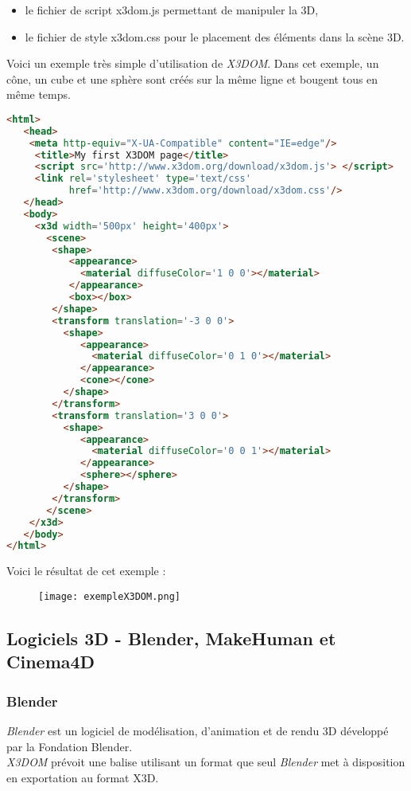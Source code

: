\begin{itemize}
\item le fichier de script x3dom.js permettant de manipuler la 3D,
\item le fichier de style x3dom.css pour le placement des éléments dans la scène 3D.\\

\end{itemize}
\pagebreak
Voici un exemple très simple d'utilisation de \textit{X3DOM}. Dans cet exemple, un cône, un cube et une sphère sont créés sur la même ligne et bougent tous en même temps.

\lstset{style=mystyle} 
\begin{lstlisting}[language=Html]
<html> 
   <head>
    <meta http-equiv="X-UA-Compatible" content="IE=edge"/> 
     <title>My first X3DOM page</title> 
     <script src='http://www.x3dom.org/download/x3dom.js'> </script> 
     <link rel='stylesheet' type='text/css' 
           href='http://www.x3dom.org/download/x3dom.css'/> 
   </head> 
   <body> 
	 <x3d width='500px' height='400px'> 
	   <scene> 
		<shape> 
		   <appearance> 
			 <material diffuseColor='1 0 0'></material> 
		   </appearance> 
		   <box></box> 
		</shape> 
		<transform translation='-3 0 0'> 
		  <shape> 
			 <appearance> 
			   <material diffuseColor='0 1 0'></material> 
			 </appearance> 
			 <cone></cone> 
		  </shape> 
		</transform> 
		<transform translation='3 0 0'> 
		  <shape> 
			 <appearance> 
			   <material diffuseColor='0 0 1'></material> 
			 </appearance> 
			 <sphere></sphere> 
		  </shape> 
		</transform> 
	   </scene> 
	</x3d> 
   </body> 
</html> 
\end{lstlisting}

Voici le résultat de cet exemple : 
\begin{figure}[H]
\centering
	\texttt{[image: exempleX3DOM.png]}
\end{figure}

\subsection{Logiciels 3D - Blender, MakeHuman et Cinema4D}  \label{logiciel3D}

\subsubsection{Blender}
\textit{Blender} est un logiciel de modélisation, d'animation et de rendu 3D développé par la \textsf{Fondation Blender}. \\
\textit{X3DOM} prévoit une balise utilisant un format que seul \textit{Blender} met à disposition en exportation au format X3D. 

